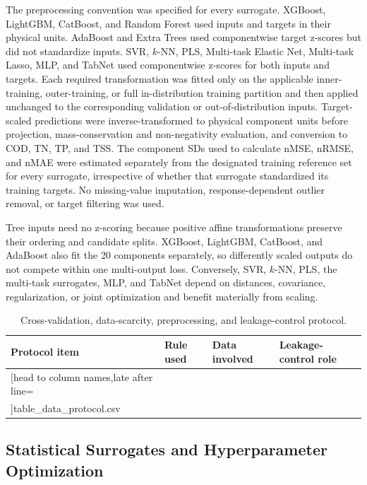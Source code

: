 \documentclass[a4paper,fleqn]{cas-sc}
\newcommand{\csvrowsfour}[1]{%
  \csvreader[head to column names,late after line=\\]{#1}{}{\colA & \colB & \colC & \colD}}
\begin{document}
The preprocessing convention was specified for every surrogate. XGBoost, LightGBM, CatBoost, and Random Forest used inputs and targets in their physical units. AdaBoost and Extra Trees used componentwise target z-scores but did not standardize inputs. SVR, $k$-NN, PLS, Multi-task Elastic Net, Multi-task Lasso, MLP, and TabNet used componentwise z-scores for both inputs and targets. Each required transformation was fitted only on the applicable inner-training, outer-training, or full in-distribution training partition and then applied unchanged to the corresponding validation or out-of-distribution inputs. Target-scaled predictions were inverse-transformed to physical component units before projection, mass-conservation and non-negativity evaluation, and conversion to COD, TN, TP, and TSS. The component SDs used to calculate nMSE, nRMSE, and nMAE were estimated separately from the designated training reference set for every surrogate, irrespective of whether that surrogate standardized its training targets. No missing-value imputation, response-dependent outlier removal, or target filtering was used.

Tree inputs need no z-scoring because positive affine transformations preserve their ordering and candidate splits. XGBoost, LightGBM, CatBoost, and AdaBoost also fit the 20 components separately, so differently scaled outputs do not compete within one multi-output loss. Conversely, SVR, $k$-NN, PLS, the multi-task surrogates, MLP, and TabNet depend on distances, covariance, regularization, or joint optimization and benefit materially from scaling.



\begin{table}[htbp]
\centering
\caption{Cross-validation, data-scarcity, preprocessing, and leakage-control protocol.}
\label{tab:data_protocol}
\scriptsize
\setlength{\tabcolsep}{3pt}
\begin{tabular}{p{2.6cm}p{3.1cm}p{3.0cm}p{3.1cm}}
\hline
Protocol item & Rule used & Data involved & Leakage-control role \\
\hline
\csvrowsfour{table_data_protocol.csv}
\hline
\end{tabular}
\end{table}

\subsection{Statistical Surrogates and Hyperparameter Optimization}
\end{document}
